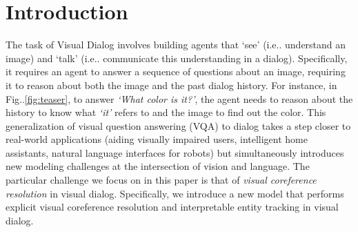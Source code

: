 \documentclass[runningheads]{llncs}
\makeatletter
\DeclareRobustCommand\onedot{\futurelet\@let@token\@onedot}
\def\@onedot{\ifx\@let@token.\else.\null\fi\xspace}
\def\ie{i.e\onedot} \def\Ie{I.e\onedot}
\def\Fig{Fig\onedot}
\makeatother
\begin{document}
\section{Introduction}
The task of Visual Dialog \cite{visdial,guesswhat} involves building agents 
that `see' (\ie understand an image) and `talk' (\ie communicate this 
understanding in a dialog).
Specifically, it requires an agent to answer a sequence of questions about an 
image, requiring it to reason about both the image and the past dialog history.
For instance, in \Fig\ref{fig:teaser}, to answer \textit{`What color is it?'},
the agent needs to reason about the history to know what \textit{`it'} refers
to and the image to find out the color.
This generalization of visual question answering (VQA) \cite{antol15iccv} to
dialog takes a step closer to real-world applications (aiding visually impaired 
users, intelligent home assistants, natural language interfaces for robots) but
simultaneously introduces new modeling challenges at the intersection of vision
and language. 
The particular challenge we focus on in this paper is that of \emph{visual 
coreference resolution} in visual dialog. 
Specifically, we introduce a new model that performs explicit visual 
coreference resolution and interpretable entity tracking in visual dialog. 
\end{document}
